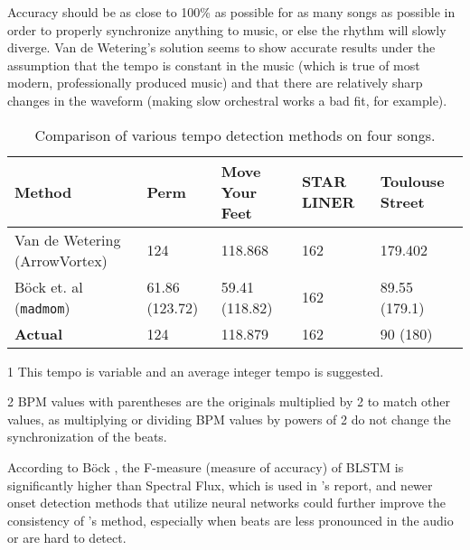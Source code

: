 \documentclass[11pt, oneside]{article}
\begin{document}
Accuracy should be as close to 100\% as possible for as many songs as possible
in order to properly synchronize anything to music, or else the rhythm will
slowly diverge. Van de Wetering’s solution seems to show accurate results under
the assumption that the tempo is constant in the music (which is true of most
modern, professionally produced music) and that there are relatively sharp
changes in the waveform (making slow orchestral works a bad fit, for example).

\begin{table}[!htbp]
    \centering
    \begin{threeparttable}
    \begin{tabular}{M{3cm} M{1.5cm} M{2cm} M{1.5cm} M{2cm}}
    \toprule
    \textbf{Method}                & \textbf{Perm}   & \textbf{Move Your Feet} & \textbf{STAR LINER} & \textbf{Toulouse Street} \\ \midrule
    Van de Wetering (ArrowVortex)  & 124             & 118.868                 & 162      & 179.402            \\
    Böck et. al (\texttt{madmom})  & 61.86 (123.72)  & 59.41 (118.82)          & 162      & 89.55 (179.1)      \\
    \addlinespace[0.15cm]
    \textbf{Actual}                & 124             & 118.879                 & 162      & 90 (180)  \\
    \bottomrule
    \end{tabular}
    \begin{tablenotes}
    \item[1] This tempo is variable and an average integer tempo is suggested.
    \item[2] BPM values with parentheses are the originals multiplied by 2 to match other values, as multiplying or dividing BPM values by powers of 2 do not change the synchronization of the beats.
    \end{tablenotes}
    \end{threeparttable}
    \caption{Comparison of various tempo detection methods on four songs.}
    \label{tab:initial}
\end{table}

According to Böck \cite{bockcomb}, the F-measure (measure of accuracy) of BLSTM
is significantly higher than Spectral Flux, which is used in
\citeauthor*{bram}'s report, and newer onset detection methods that utilize
neural networks could further improve the consistency of \citeauthor*{bram}’s
method, especially when beats are less pronounced in the audio or are hard to
detect.
\end{document}
